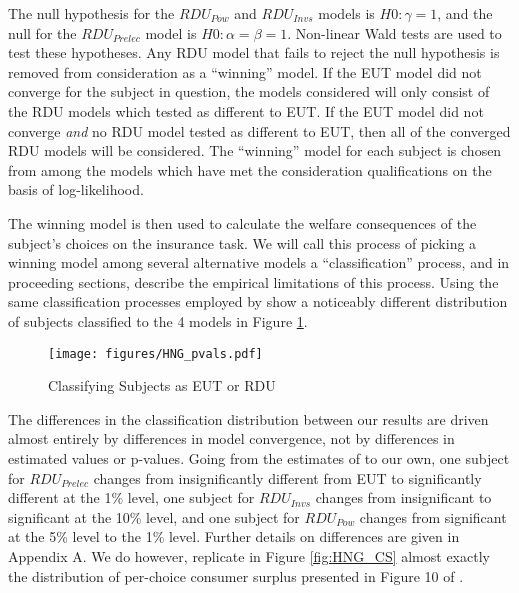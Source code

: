\documentclass[11pt,a4paper]{report}
\newcommand{\onlyinsubfile}[1]{#1}
\newcommand{\notinsubfile}[1]{}
\begin{document}
The null hypothesis for the $\mathit{RDU_{Pow}}$ and $\mathit{RDU_{Invs}}$ models is $H0: \gamma = 1$, and the null for the $\mathit{RDU_{Prelec}}$ model is $H0: \alpha = \beta = 1$.
Non-linear Wald tests are used to test these hypotheses.
Any RDU model that fails to reject the null hypothesis is removed from consideration as a \enquote{winning} model.
If the EUT model did not converge for the subject in question, the models considered will only consist of the RDU models which tested as different to EUT.
If the EUT model did not converge \textit{and} no RDU model tested as different to EUT, then all of the converged RDU models will be considered.
The \enquote{winning} model for each subject is chosen from among the models which have met the consideration qualifications on the basis of log-likelihood.

The winning model is then used to calculate the welfare consequences of the subject's choices on the insurance task.
We will call this process of picking a winning model among several alternative models a \enquote{classification} process, and in proceeding sections, describe the empirical limitations of this process.
Using the same classification processes employed by \textcite{Harrison2016} show a noticeably different distribution of subjects classified to the 4 models in Figure \ref{fig:HNG_pvals}.

\begin{figure}[h!]
	\center
	\caption{Classifying Subjects as EUT or RDU}
	\onlyinsubfile{
		\texttt{[image: figures/HNG\_pvals.pdf]}
	}
	\notinsubfile{
		\texttt{[image: ch4/figures/HNG\_pvals.pdf]}
	}
	\label{fig:HNG_pvals}
\end{figure}

The differences in the classification distribution between our results are driven almost entirely by differences in model convergence, not by differences in estimated values or p-values.
Going from the estimates of \textcite{Harrison2016} to our own, one subject for $\mathit{RDU_{Prelec}}$ changes from insignificantly different from EUT to significantly different at the 1\% level, one subject for $\mathit{RDU_{Invs}}$ changes from insignificant to significant at the 10\% level, and one subject for $\mathit{RDU_{Pow}}$ changes from significant at the 5\% level to the 1\% level.
Further details on differences are given in Appendix A.
We do however, replicate in Figure \ref{fig:HNG_CS} almost exactly the distribution of per-choice consumer surplus presented in Figure 10 of \textcite[108]{Harrison2016}.
\end{document}
